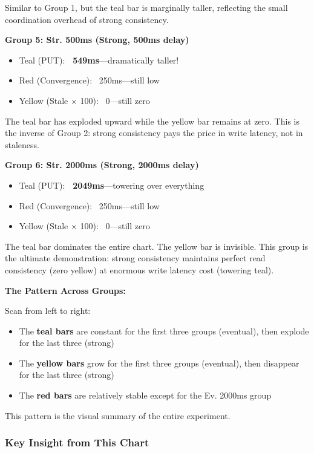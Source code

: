\documentclass[10pt,a4paper]{article}
\begin{document}
Similar to Group 1, but the teal bar is marginally taller, reflecting the small coordination overhead of strong consistency.

\textbf{Group 5: Str. 500ms (Strong, 500ms delay)}

\begin{itemize}
    \item Teal (PUT): \textbf{~549ms}---dramatically taller!
    \item Red (Convergence): ~250ms---still low
    \item Yellow (Stale × 100): ~0---still zero
\end{itemize}

The teal bar has exploded upward while the yellow bar remains at zero. This is the inverse of Group 2: strong consistency pays the price in write latency, not in staleness.

\textbf{Group 6: Str. 2000ms (Strong, 2000ms delay)}

\begin{itemize}
    \item Teal (PUT): \textbf{~2049ms}---towering over everything
    \item Red (Convergence): ~250ms---still low
    \item Yellow (Stale × 100): ~0---still zero
\end{itemize}

The teal bar dominates the entire chart. The yellow bar is invisible. This group is the ultimate demonstration: strong consistency maintains perfect read consistency (zero yellow) at enormous write latency cost (towering teal).

\textbf{The Pattern Across Groups:}

Scan from left to right:
\begin{itemize}
    \item The \textbf{teal bars} are constant for the first three groups (eventual), then explode for the last three (strong)
    \item The \textbf{yellow bars} grow for the first three groups (eventual), then disappear for the last three (strong)
    \item The \textbf{red bars} are relatively stable except for the Ev. 2000ms group
\end{itemize}

This pattern is the visual summary of the entire experiment.

\subsubsection{Key Insight from This Chart}
\end{document}
